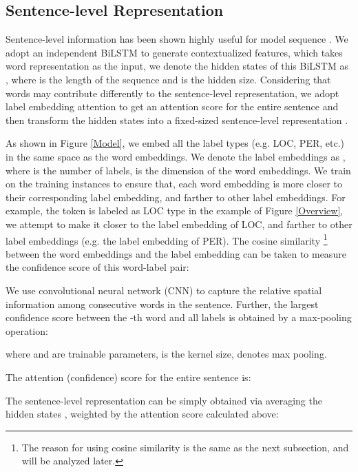 \documentclass[letterpaper]{article} \usepackage{aaai20}  \usepackage{times}  \usepackage{helvet} \usepackage{courier}  \usepackage[hyphens]{url}  \usepackage{graphicx} \urlstyle{rm} \def\UrlFont{\rm}  \usepackage{graphicx}  \frenchspacing  \setlength{\pdfpagewidth}{8.5in}  \setlength{\pdfpageheight}{11in}
\begin{document}
\subsection{Sentence-level Representation} 
Sentence-level  information has been shown highly
useful for model sequence \cite{zhang2018sentence,liu2019gcdt}.
We adopt an independent BiLSTM to generate contextualized features, which takes word representation  as the input, we denote the hidden states of this BiLSTM as , where  is the length of the sequence and  is the hidden size. 
Considering that words may contribute differently to the sentence-level representation, we adopt label embedding attention \cite{wang2018joint} to get an attention score for the entire sentence and then transform the hidden states  into a fixed-sized sentence-level representation .  

As shown in Figure \ref{Model}, we embed all the label types (e.g. LOC, PER, etc.) in the same space as the word embeddings. We denote the label embeddings as , where   is the number of labels,  is the dimension of the word embeddings. 
We train on the training instances to ensure that, each word embedding is more closer to their corresponding label embedding, and farther to other label embeddings. 
For example, the token  is labeled as LOC type in the example of Figure \ref{Overview}, we attempt to make it closer to the label embedding of LOC, and farther to other label embeddings (e.g. the label embedding of PER).
The cosine similarity
\footnote{The reason for using cosine similarity is the same as the next subsection, and will be analyzed later.} 
 between the word embeddings  and the label embedding  can be taken to measure the confidence score of this word-label pair:



We use convolutional neural network (CNN) to capture the relative spatial information among consecutive words in the sentence. Further, the largest confidence score  between the -th word and all labels is obtained by a max-pooling operation:

 
where  and  are trainable parameters,  is the kernel size,  denotes max pooling.

The attention (confidence) score  for the entire sentence is:



The sentence-level representation  can be simply obtained via averaging the hidden states , weighted by the attention score calculated above:
\end{document}
